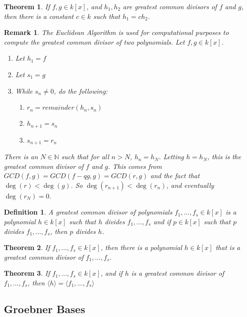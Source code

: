 \documentclass{article}
\theoremstyle{mystyle}
\newtheorem{theorem}{Theorem}[section]
\newtheorem{definition}{Definition}[section]
\newtheorem{remark}{Remark}[section]
\begin{document}
\begin{theorem}
If $f,g\in k[x]$, and $h_1,h_2$ are greatest common divisors of $f$ and $g$, then there is a constant $c\in k$ such that $h_1 = ch_2$.
\end{theorem}
\begin{remark}
The Euclidean Algorithm is used for computational purposes to compute the greatest common divisor of two polynomials. Let $f,g\in k[x]$.
\begin{enumerate}
    \item Let $h_1 = f$
    \item Let $s_1 = g$
    \item While $s_n \ne 0$, do the following:
    \begin{enumerate}
        \item $r_n = remainder(h_n,s_n)$
        \item $h_{n+1} = s_n$
        \item $s_{n+1} = r_n$
    \end{enumerate}
\end{enumerate}
There is an $N\in \mathbb{N}$ such that for all $n>N$, $h_n = h_N$. Letting $h = h_N$, this is the greatest common divisor of $f$ and $g$. This comes from $GCD(f,g) = GCD(f-qg,g) = GCD(r,g)$ and the fact that $\deg(r)< \deg(g)$. So $\deg(r_{n+1})<\deg(r_n)$, and eventually $\deg(r_N) = 0$.
\end{remark}
\begin{definition}
A greatest common divisor of polynomials $f_1,\hdots, f_s \in k[x]$ is a polynomial $h\in k[x]$ such that $h$ divides $f_1,\hdots, f_s$ and if $p\in k[x]$ such that $p$ divides $f_1,\hdots, f_s$, then $p$ divides $h$.
\end{definition}
\begin{theorem}
If $f_1,\hdots, f_s\in k[x]$, then there is a polynomial $h\in k[x]$ that is a greatest common divisor of $f_1,\hdots, f_s$.
\end{theorem}
\begin{theorem}
If $f_1,\hdots, f_s\in k[x]$, and if $h$ is a greatest common divisor of $f_1,\hdots, f_s$, then $\langle h \rangle = \langle f_1,\hdots, f_s\rangle$
\end{theorem}
\subsection{Groebner Bases}
\end{document}
